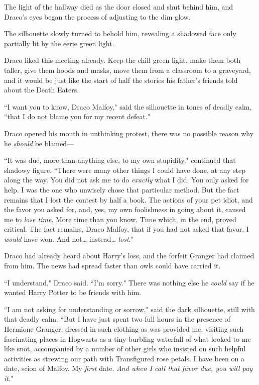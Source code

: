 The light of the hallway died as the door closed and shut behind him, and Draco's eyes began the process of adjusting to the dim glow.

The silhouette slowly turned to behold him, revealing a shadowed face only partially lit by the eerie green light.

Draco liked this meeting already. Keep the chill green light, make them both taller, give them hoods and masks, move them from a classroom to a graveyard, and it would be just like the start of half the stories his father's friends told about the Death Eaters.

``I want you to know, Draco Malfoy," said the silhouette in tones of deadly calm, ``that I do not blame you for my recent defeat."

Draco opened his mouth in unthinking protest, there was no possible reason why he \emph{should} be blamed—

``It was due, more than anything else, to my own stupidity," continued that shadowy figure. ``There were many other things I could have done, at any step along the way. You did not ask me to do \emph{exactly} what I did. You only asked for help. I was the one who unwisely chose that particular method. But the fact remains that I lost the contest by half a book. The actions of your pet idiot, and the favor you asked for, and, yes, my own foolishness in going about it, caused me to \emph{lose time}. More time than you know. Time which, in the end, proved critical. The fact remains, Draco Malfoy, that if you had not asked that favor, I \emph{would} have won. And not{\ldots} instead{\ldots} \emph{lost}."

Draco had already heard about Harry's loss, and the forfeit Granger had claimed from him. The news had spread faster than owls could have carried it.

``I understand," Draco said. ``I'm sorry." There was nothing else he \emph{could} say if he wanted Harry Potter to be friends with him.

``I am not asking for understanding or sorrow," said the dark silhouette, still with that deadly calm. ``But I have just spent two full hours in the presence of Hermione Granger, dressed in such clothing as was provided me, visiting such fascinating places in Hogwarts as a tiny burbling waterfall of what looked to me like snot, accompanied by a number of other girls who insisted on such helpful activities as strewing our path with Transfigured rose petals. I have been on a date, scion of Malfoy. My \emph{first} date. \emph{And when I call that favor due, you will pay it.}"

